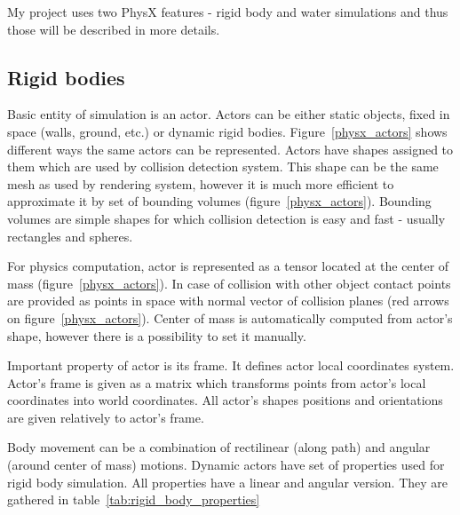 
My project uses two PhysX features - rigid body and water simulations and thus those will be described in more details. 

\subsection{Rigid bodies}

Basic entity of simulation is an actor. Actors can be either static objects, fixed in space (walls, ground, etc.) or dynamic rigid bodies.
Figure~\ref{physx_actors} shows different ways the same actors can be represented. Actors have shapes assigned to them which are used by collision detection system. This shape can be the same mesh as used by rendering system, however it is much more efficient to approximate it by set of bounding volumes (figure~\ref{physx_actors}). Bounding volumes are simple shapes for which collision detection is easy and fast - usually rectangles and spheres. 

For physics computation, actor is represented as a tensor located at the center of mass (figure~\ref{physx_actors}). In case of collision with other object contact points are provided as points in space with normal vector of collision planes (red arrows on figure~\ref{physx_actors}). Center of mass is automatically computed from actor's shape, however there is a possibility to set it manually.

Important property of actor is its frame. It defines actor local coordinates system. Actor's frame is given as a matrix which transforms points from actor's local coordinates into world coordinates. All actor's shapes positions and orientations are given relatively to actor's frame.

Body movement can be a combination of rectilinear (along path) and angular (around center of mass) motions. Dynamic actors have set of properties used for rigid body simulation. All properties have a linear and angular version. They are gathered in table~\ref{tab:rigid_body_properties}

